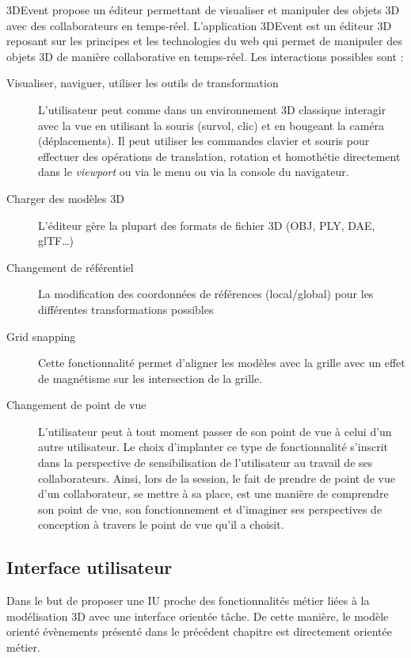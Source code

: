 3DEvent propose un éditeur permettant de visualiser et manipuler des 
objets 3D  avec des collaborateurs en temps-réel. L'application 3DEvent est un 
éditeur 3D reposant sur les principes et les technologies du web qui permet de 
manipuler des objets 3D de manière 
collaborative en temps-réel. Les interactions possibles sont : 
\begin{description}
	
	\item[Visualiser, naviguer, utiliser les outils de transformation] L'utilisateur peut 
	com\-me dans un environnement 3D classique interagir avec la vue en utilisant 
	la souris (survol, clic) et en bougeant la caméra (déplacements). Il peut 
	utiliser les commandes clavier et souris pour effectuer des opérations de 
	translation, rotation et homothétie directement dans le \textit{viewport} ou via le 
	menu ou via la console du navigateur.
	\item[Charger des modèles 3D] L'éditeur gère la plupart des formats de fichier 
	3D (OBJ, PLY, DAE, glTF\ldots)
	\item[Changement de référentiel] La modification des coordonnées de 
	réfé\-ren\-ces (local/global)  pour les différentes transformations possibles
	\item[Grid snapping] Cette fonctionnalité permet d'aligner les modèles avec la 
	grille avec un effet de magnétisme sur les intersection de la grille.
	\item[Changement de point de vue] L'utilisateur peut à tout moment passer de 
	son point de vue à celui d'un autre utilisateur. Le choix d'implanter ce type de 
	fonctionnalité s'inscrit dans la perspective de sensibilisation de l'utilisateur au 
	travail de ses collaborateurs. Ainsi, lors de la session, le fait de prendre de 
	point de vue d'un collaborateur, se mettre à sa place, est une manière de 
	comprendre son point de vue, son fonctionnement et d'imaginer ses 
	perspectives de conception à travers le point de vue qu'il a choisit.
\end{description}


\subsection{Interface utilisateur}
Dans le but de proposer une \gls{IU} proche des fonctionnalités métier liées à la 
modélisation 3D avec une interface orientée tâche. De cette manière, le modèle 
orienté évènements présenté dans le précédent chapitre est directement orientée 
métier.
